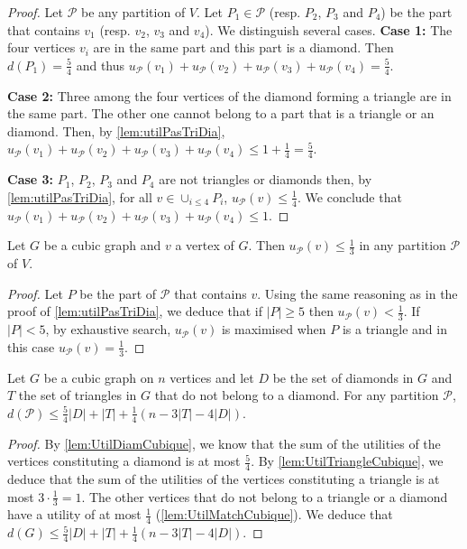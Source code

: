 \documentclass[a4paper,USenglish,cleveref, autoref]{lipics-v2021}
\begin{document}
\begin{proof}
Let $\mathcal{P}$ be any partition of $V$. Let $P_1 \in \mathcal{P}$ (resp. $P_2$, $P_3$ and $P_4$) be the part that contains $v_1$ (resp. $v_2$, $v_3$ and $v_4$). We distinguish several cases.
\noindent
\textbf{Case 1:} The four   vertices $v_i$ are in the same part and this part is a diamond. Then $d(P_1) = \frac{5}{4}$ and thus $u_{\mathcal{P}}(v_1) + u_{\mathcal{P}}(v_2) + u_{\mathcal{P}}(v_3) + u_{\mathcal{P}}(v_4) = \frac{5}{4}$.
 
\noindent
\textbf{Case 2:} Three among the four vertices of the diamond forming a triangle are in the same part. The other one cannot belong to a part that is a triangle or an diamond. Then, by \autoref{lem:utilPasTriDia}, $u_{\mathcal{P}}(v_1) + u_{\mathcal{P}}(v_2) + u_{\mathcal{P}}(v_3) + u_{\mathcal{P}}(v_4) \leq 1 + \frac{1}{4} = \frac{5}{4}$.
 

\noindent
\textbf{Case 3:} $P_1$, $P_2$, $P_3$ and $P_4$ are not triangles or diamonds then, by \autoref{lem:utilPasTriDia}, for all $v \in \cup_{i \leq 4} P_i$, $u_{\mathcal{P}}(v) \leq \frac{1}{4}$. We conclude that $u_{\mathcal{P}}(v_1) + u_{\mathcal{P}}(v_2) + u_{\mathcal{P}}(v_3) + u_{\mathcal{P}}(v_4) \leq 1$.
\end{proof}



\begin{lemma}
\label{lem:UtilTriangleCubique}
Let $G$ be a cubic graph and $v$ a vertex of $G$. Then $u_{\mathcal{P}}(v) \leq \frac{1}{3}$ in any partition $\mathcal{P}$ of $V$.
\end{lemma}

\begin{proof}
Let $P$ be the part of $\mathcal{P}$ that contains $v$. Using the same reasoning as in the proof of \autoref{lem:utilPasTriDia}, we deduce that if $|P| \geq 5$ then $u_{\mathcal{P}}(v) < \frac{1}{3}$. If $|P| < 5$, by exhaustive search, $u_{\mathcal{P}}(v)$ is maximised when  $P$ is a   triangle  and in this case $u_{\mathcal{P}}(v) = \frac{1}{3}$.
\end{proof}

\begin{lemma}
\label{lem:ApproxBorneCubique}
Let $G$ be a cubic graph on $n$ vertices and let $D$ be the set of diamonds in $G$ and $T$ the set of triangles in $G$  that do not belong to a diamond. For any partition $\mathcal{P}$, $d(\mathcal{P}) \leq \frac{5}{4}|D| + |T| + \frac{1}{4}(n - 3|T| - 4|D|)$.
\end{lemma}
\begin{proof}
By \autoref{lem:UtilDiamCubique}, we know that the sum of the utilities of the vertices constituting a diamond is at most $\frac{5}{4}$. By \autoref{lem:UtilTriangleCubique}, we deduce that the sum of the utilities of the vertices constituting a triangle is at most $3 \cdot \frac{1}{3} = 1$. The other vertices that do not belong to a triangle or a diamond have a utility of at most $\frac{1}{4}$ (\autoref{lem:UtilMatchCubique}). We deduce that $d(G) \leq \frac{5}{4}|D| + |T| + \frac{1}{4}(n - 3|T| - 4|D|)$.
\end{proof}
\end{document}
